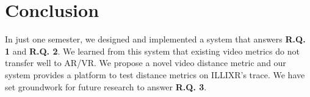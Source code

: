 


\section{Conclusion}

In just one semester, we designed and implemented a system that answers \textbf{R.Q. 1} and \textbf{R.Q. 2}.
We learned from this system that existing video metrics do not transfer well to AR/VR.
We propose a novel video distance metric and our system provides a platform to test distance metrics on ILLIXR's trace.
We have set groundwork for future research to answer \textbf{R.Q. 3}.
